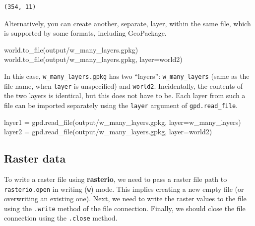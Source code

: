 \documentclass[
  letterpaper,
]{krantz}
\newenvironment{Shaded}{\begin{snugshade}}{\end{snugshade}}
\newcommand{\NormalTok}[1]{\textcolor[rgb]{0.00,0.23,0.31}{#1}}
\newcommand{\OperatorTok}[1]{\textcolor[rgb]{0.37,0.37,0.37}{#1}}
\newcommand{\StringTok}[1]{\textcolor[rgb]{0.13,0.47,0.30}{#1}}
\begin{document}
\begin{verbatim}
(354, 11)
\end{verbatim}

Alternatively, you can create another, separate, layer, within the same
file, which is supported by some formats, including GeoPackage.

\begin{Shaded}
\begin{Highlighting}[]
\NormalTok{world.to\_file(}\StringTok{\textquotesingle{}output/w\_many\_layers.gpkg\textquotesingle{}}\NormalTok{)}
\NormalTok{world.to\_file(}\StringTok{\textquotesingle{}output/w\_many\_layers.gpkg\textquotesingle{}}\NormalTok{, layer}\OperatorTok{=}\StringTok{\textquotesingle{}world2\textquotesingle{}}\NormalTok{)}
\end{Highlighting}
\end{Shaded}

In this case, \texttt{w\_many\_layers.gpkg} has two ``layers'':
\texttt{w\_many\_layers} (same as the file name, when \texttt{layer} is
unspecified) and \texttt{world2}. Incidentally, the contents of the two
layers is identical, but this does not have to be. Each layer from such
a file can be imported separately using the \texttt{layer} argument of
\texttt{gpd.read\_file}.

\begin{Shaded}
\begin{Highlighting}[]
\NormalTok{layer1 }\OperatorTok{=}\NormalTok{ gpd.read\_file(}\StringTok{\textquotesingle{}output/w\_many\_layers.gpkg\textquotesingle{}}\NormalTok{, layer}\OperatorTok{=}\StringTok{\textquotesingle{}w\_many\_layers\textquotesingle{}}\NormalTok{)}
\NormalTok{layer2 }\OperatorTok{=}\NormalTok{ gpd.read\_file(}\StringTok{\textquotesingle{}output/w\_many\_layers.gpkg\textquotesingle{}}\NormalTok{, layer}\OperatorTok{=}\StringTok{\textquotesingle{}world2\textquotesingle{}}\NormalTok{)}
\end{Highlighting}
\end{Shaded}

\subsection{Raster data}\label{sec-data-output-raster}

To write a raster file using \textbf{rasterio}, we need to pass a raster
file path to \texttt{rasterio.open} in writing
(\texttt{\textquotesingle{}w\textquotesingle{}}) mode. This implies
creating a new empty file (or overwriting an existing one). Next, we
need to write the raster values to the file using the \texttt{.write}
method of the file connection. Finally, we should close the file
connection using the \texttt{.close} method.
\end{document}
